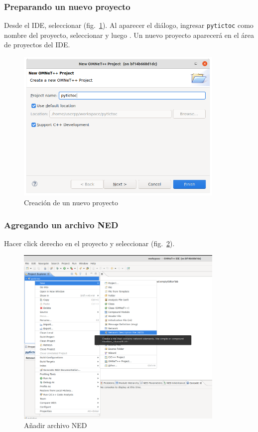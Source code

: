 \documentclass[]{article}
\begin{document}
\subsubsection{Preparando un nuevo proyecto}

Desde el IDE, seleccionar  (fig.~\ref{fig:new_project}). Al aparecer el diálogo, ingresar
\verb!pytictoc! como nombre del proyecto, seleccionar  y
luego . Un nuevo proyecto aparecerá en el área de proyectos del IDE.

\begin{figure}[h]
\caption{Creación de un nuevo proyecto}
\label{fig:new_project}
\centering
\includegraphics[width=10cm]{new_project}
\end{figure}

\subsubsection{Agregando un archivo NED}

Hacer click derecho en el proyecto y seleccionar  (fig.~\ref{fig:new_ned}).

\begin{figure}[h]
\caption{Añadir archivo NED}
\label{fig:new_ned}
\centering
\includegraphics[width=10cm]{add_ned}
\end{figure}
\end{document}
